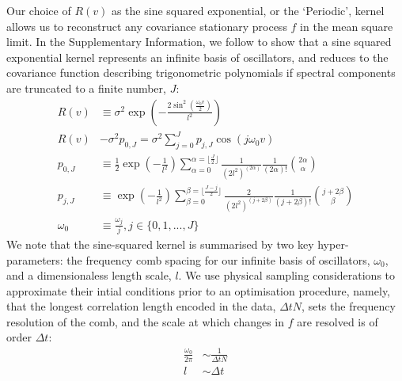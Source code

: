 Our choice of $R(v)$ as the sine squared exponential, or the `Periodic', kernel allows us to reconstruct any covariance stationary process $f$ in the mean square limit. In the Supplementary Information, we follow \cite{solin2014} to show that a sine squared exponential kernel represents an infinite basis of oscillators, and reduces to the covariance function describing trigonometric polynomials if spectral components are truncated to a finite number, $J$:
\begin{align}
R(v) &\equiv \sigma^2 \exp (- \frac{2\sin^2(\frac{\omega_0 v}{2})}{l^2}) \\
R(v) &- \sigma^2 p_{0,J}  = \sigma^2 \sum_{j=0}^{J} p_{j,J} \cos(j\omega_0 v)\\
p_{0,J} & \equiv \frac{1}{2} \exp (- \frac{1}{l^2}) \sum_{\alpha = 0}^{\alpha = \lfloor\frac{J}{2}\rfloor} \frac{1}{(2l^2)^{(2\alpha)}} \frac{1}{(2\alpha)!} \binom{2\alpha}{\alpha} \label{eqn:p0J}\\
p_{j,J} & \equiv \exp (- \frac{1}{l^2}) \sum_{\beta = 0}^{\beta = \lfloor\frac{J-j}{2}\rfloor} \frac{2}{(2l^2)^{(j + 2\beta)}} \frac{1}{(j + 2\beta)!} \binom{j + 2\beta}{\beta} \label{eqn:pjJ} \\
\omega_0 &\equiv \frac{\omega_j}{j}, j \in \{0, 1,..., J\} 
\end{align}
We note that the sine-squared kernel is summarised by two key hyper-parameters: the frequency comb spacing for our infinite basis of oscillators, $\omega_0$, and a dimensionaless length scale, $l$. We use physical sampling considerations to approximate their intial conditions prior to an optimisation procedure, namely, that the longest correlation length encoded in the data, $\Delta t N$, sets the frequency resolution of the comb, and the scale at which changes in $f$ are resolved is of order  $\Delta t$:
\begin{align}
\frac{\omega_0}{2\pi} & \sim  \frac{1}{\Delta t N} \\
l & \sim \Delta t
\end{align}
